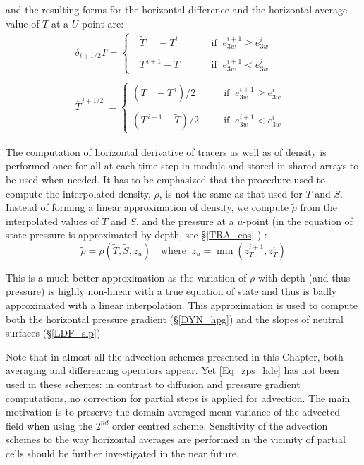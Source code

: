 and the resulting forms for the horizontal difference and the horizontal average 
value of $T$ at a $U$-point are: 
\begin{equation} \label{Eq_zps_hde}
\begin{aligned}
 \delta _{i+1/2} T= 	\begin{cases}
\ \ \ \widetilde {T}\quad\ -T^i	 	& \ \ \quad\quad\text{if  $\ e_{3w}^{i+1} \geq e_{3w}^i$ } \\
										\\
\ \ \ T^{\,i+1}-\widetilde{T}		& \ \ \quad\quad\text{if  $\ e_{3w}^{i+1}    <   e_{3w}^i$   } 
            		\end{cases}     \\
\\
\overline {T}^{\,i+1/2} \ = 	\begin{cases}
( \widetilde {T}\ \ \;\,-T^{\,i})	 / 2	& \;\ \ \quad\text{if  $\ e_{3w}^{i+1} \geq e_{3w}^i$ } \\
										\\
( T^{\,i+1}-\widetilde{T} ) / 2		& \;\ \ \quad\text{if  $\ e_{3w}^{i+1}    <   e_{3w}^i$   } 
            \end{cases}
\end{aligned}
\end{equation}

The computation of horizontal derivative of tracers as well as of density is 
performed once for all at each time step in  module and stored 
in shared arrays to be used when needed. It has to be emphasized that the 
procedure used to compute the interpolated density, $\widetilde{\rho}$, is not 
the same as that used for $T$ and $S$. Instead of forming a linear approximation 
of density, we compute $\widetilde{\rho }$ from the interpolated values of $T$ 
and $S$, and the pressure at a $u$-point (in the equation of state pressure is 
approximated by depth, see \S\ref{TRA_eos} ) : 
\begin{equation} \label{Eq_zps_hde_rho}
\widetilde{\rho } = \rho ( {\widetilde{T},\widetilde {S},z_u }) 
\quad \text{where }\  z_u = \min \left( {z_T^{i+1} ,z_T^i } \right)
\end{equation} 

This is a much better approximation as the variation of $\rho$ with depth (and 
thus pressure) is highly non-linear with a true equation of state and thus is badly 
approximated with a linear interpolation. This approximation is used to compute 
both the horizontal pressure gradient (\S\ref{DYN_hpg}) and the slopes of neutral 
surfaces (\S\ref{LDF_slp})

Note that in almost all the advection schemes presented in this Chapter, both 
averaging and differencing operators appear. Yet \eqref{Eq_zps_hde} has not 
been used in these schemes: in contrast to diffusion and pressure gradient 
computations, no correction for partial steps is applied for advection. The main 
motivation is to preserve the domain averaged mean variance of the advected 
field when using the $2^{nd}$ order centred scheme. Sensitivity of the advection 
schemes to the way horizontal averages are performed in the vicinity of partial 
cells should be further investigated in the near future.
